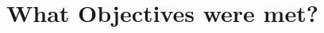 \documentclass[../dissertation.tex]{subfiles}
\begin{document}
\section{What Objectives were met?}
\end{document}
